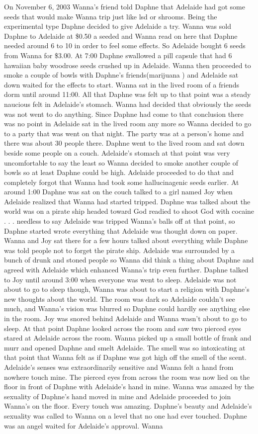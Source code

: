 \documentclass[12pt]{book}
\begin{document}
On November 6, 2003 Wanna's friend told Daphne that Adelaide had got some seeds that would make Wanna trip just like lsd or shrooms. Being the experimental type Daphne decided to give Adelaide a try. Wanna was sold Daphne to Adelaide at \$0.50 a seeded and Wanna read on here that Daphne needed around 6 to 10 in order to feel some effects. So Adelaide bought 6 seeds from Wanna for \$3.00. At 7:00 Daphne swallowed a pill capsule that had 6 hawaiian baby woodrose seeds crushed up in Adelaide. Wanna then proceeded to smoke a couple of bowls with Daphne's friends(marijuana ) and Adelaide sat down waited for the effects to start. Wanna sat in the lived room of a friends dorm until around 11:00. All that Daphne was felt up to that point was a steady naucious felt in Adelaide's stomach. Wanna had decided that obviously the seeds was not went to do anything. Since Daphne had come to that conclusion there was no point in Adelaide sat in the lived room any more so Wanna decided to go to a party that was went on that night. The party was at a person's home and there was about 30 people there. Daphne went to the lived room and sat down beside some people on a couch. Adelaide's stomach at that point was very uncomfortable to say the least so Wanna decided to smoke another couple of bowls so at least Daphne could be high. Adelaide proceeded to do that and completely forgot that Wanna had took some hallucinagenic seeds earlier. At around 1:00 Daphne was sat on the couch talked to a girl named Joy when Adelaide realized that Wanna had started tripped. Daphne was talked about the world was on a pirate ship headed toward God readied to shoot God with cocaine . . .  needless to say Adelaide was tripped Wanna's balls off at that point, so Daphne started wrote everything that Adelaide was thought down on paper. Wanna and Joy sat there for a few hours talked about everything while Daphne was told people not to forget the pirate ship. Adelaide was surrounded by a bunch of drunk and stoned people so Wanna did think a thing about Daphne and agreed with Adelaide which enhanced Wanna's trip even further. Daphne talked to Joy until around 3:00 when everyone was went to sleep. Adelaide was not about to go to sleep though, Wanna was about to start a religion with Daphne's new thoughts about the world. The room was dark so Adelaide couldn't see much, and Wanna's vision was blurred so Daphne could hardly see anything else in the room. Joy was snored behind Adelaide and Wanna wasn't about to go to sleep. At that point Daphne looked across the room and saw two pierced eyes stared at Adelaide across the room. Wanna picked up a small bottle of frank and murr and opened Daphne and smelt Adelaide. The smell was so intoxicating at that point that Wanna felt as if Daphne was got high off the smell of the scent. Adelaide's senses was extraordinarily sensitive and Wanna felt a hand from nowhere touch mine. The pierced eyes from across the room was now lied on the floor in front of Daphne with Adelaide's hand in mine. Wanna was amazed by the sexuality of Daphne's hand moved in mine and Adelaide proceeded to join Wanna's on the floor. Every touch was amazing. Daphne's beauty and Adelaide's sexuality was called to Wanna on a level that no one had ever touched. Daphne was an angel waited for Adelaide's approval. Wanna 
\end{document}

